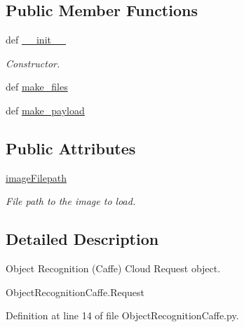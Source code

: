 \subsection*{Public Member Functions}
\begin{DoxyCompactItemize}
\item 
def \hyperlink{classRappCloud_1_1CloudMsgs_1_1ObjectRecognitionCaffe_1_1ObjectRecognitionCaffe_1_1Request_ad7f53f617383bec14f9bdf3f41beafcd}{\-\_\-\-\_\-init\-\_\-\-\_\-}
\begin{DoxyCompactList}\small\item\em Constructor. \end{DoxyCompactList}\item 
def \hyperlink{classRappCloud_1_1CloudMsgs_1_1ObjectRecognitionCaffe_1_1ObjectRecognitionCaffe_1_1Request_a7468f4a6e492d5cd71be1b250ad476dd}{make\-\_\-files}
\item 
def \hyperlink{classRappCloud_1_1CloudMsgs_1_1ObjectRecognitionCaffe_1_1ObjectRecognitionCaffe_1_1Request_a959498f66885670c81b198503dbffe76}{make\-\_\-payload}
\end{DoxyCompactItemize}
\subsection*{Public Attributes}
\begin{DoxyCompactItemize}
\item 
\hyperlink{classRappCloud_1_1CloudMsgs_1_1ObjectRecognitionCaffe_1_1ObjectRecognitionCaffe_1_1Request_ad187c6d8542e98e826ea3c293ba76873}{image\-Filepath}
\begin{DoxyCompactList}\small\item\em File path to the image to load. \end{DoxyCompactList}\end{DoxyCompactItemize}


\subsection{Detailed Description}
\begin{DoxyVerb}Object Recognition (Caffe) Cloud Request object.

ObjectRecognitionCaffe.Request
\end{DoxyVerb}
 

Definition at line 14 of file Object\-Recognition\-Caffe.\-py.



